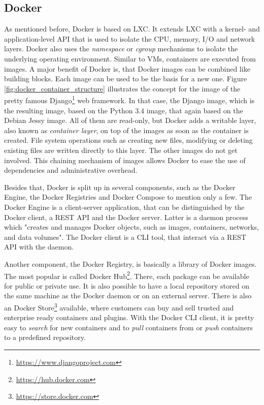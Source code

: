 \subsection{Docker}
As mentioned before, Docker is based on \ac{LXC}.
It extends \ac{LXC} with a kernel- and application-level API that is used to isolate the CPU, memory, I/O and network layers.\autocite[cf.][p. 82]{Bernstein:2014}
Docker also uses the \textit{namespace} or \textit{cgroup} mechanisms to isolate the underlying operating environment.\autocite[cf.][p. 82]{Bernstein:2014}
Similar to \acp{VM}, containers are executed from images.
A major benefit of Docker is, that Docker images can be combined like building blocks.
Each image can be used to be the basis for a new one.
Figure \ref{fig:docker_container_structure} illustrates the concept for the image of the pretty famous Django\footnote{\url{https://www.djangoproject.com}} web framework.
In that case, the Django image, which is the resulting image, based on the Python 3.4 image, that again based on the Debian Jessy image.
All of them are read-only, but Docker adds a writable layer, also known as \textit{container layer}, on top of the images as soon as the container is created.
File system operations such as creating new files, modifying or deleting existing files are written directly to this layer.\autocite[cf.]{dockerImages}
The other images do not get involved.
This chaining mechanism of images allows Docker to ease the use of dependencies and administrative overhead.

Besides that, Docker is split up in several components, such as the Docker Engine, the Docker Registries and Docker Compose to mention only a few.
The Docker Engine is a client-server application, that can be distinguished by the Docker client, a \ac{REST} \ac{API} and the Docker server.
Latter is a daemon process which "creates and manages Docker objects, such as images, containers, networks, and data volumes"\autocite{dockerEngine}.
The Docker client is a \ac{CLI} tool, that interact via a \ac{REST} \ac{API} with the daemon.\autocite[cf.]{dockerEngine}

Another component, the Docker Registry, is basically a library of Docker images.
The most popular is called Docker Hub\footnote{\url{https://hub.docker.com}}.
There, each package can be available for public or private use.
It is also possible to have a local repository stored on the same machine as the Docker daemon or on an external server.\autocite[cf.]{dockerEngine}
There is also an Docker Store\footnote{\url{https://store.docker.com}} available, where customers can buy and sell trusted and enterprise ready containers and plugins.
With the Docker \ac{CLI} client, it is pretty easy to \textit{search} for new containers and to \textit{pull} containers from or \textit{push} containers to a predefined repository.

